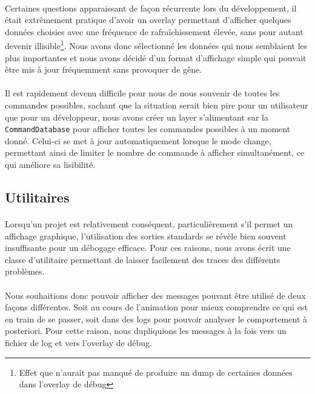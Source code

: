 \paragraph{}
Certaines questions apparaissant de façon récurrente lors du développement,
il était extrêmement pratique d'avoir un overlay permettant d'afficher
quelques données choisies avec une fréquence de rafraîchissement élevée, sans
pour autant devenir illisible\footnote{Effet que n'aurait pas manqué de
produire un dump de certaines données dans l'overlay de débug}. Nous avons
donc sélectionné les données qui nous semblaient les plus importantes et
nous avons décidé d'un format d'affichage simple qui pouvait être mis à jour
fréquemment sans provoquer de gêne.

\paragraph{}
Il est rapidement devenu difficile pour nous de nous souvenir de toutes les
commandes possibles, sachant que la situation serait bien pire pour un
utilisateur que pour un développeur, nous avons créer un layer s'alimentant
sur la \verb!CommandDatabase! pour afficher toutes les commandes possibles
à un moment donné. Celui-ci se met à jour automatiquement lorsque le mode
change, permettant ainsi de limiter le nombre de commande à afficher
simultanément, ce qui améliore sa lisibilité.


\subsection{Utilitaires}
\paragraph{}
Lorsqu'un projet est relativement conséquent, particulièrement s'il permet un
affichage graphique, l'utilisation des sorties standards se révèle bien
souvent insuffisante pour un débogage efficace. Pour ces raisons, nous avons
écrit une classe d'utilitaire permettant de laisser facilement des traces des
différents problèmes.

\paragraph{}
Nous souhaitions donc pouvoir afficher des messages pouvant être utilisé de
deux façons différentes. Soit au cours de l'animation pour mieux comprendre
ce qui est en train de se passer, soit dans des logs pour pouvoir analyser le
comportement à posteriori. Pour cette raison, nous dupliquions les messages à
la fois vers un fichier de log et vers l'overlay de débug.
